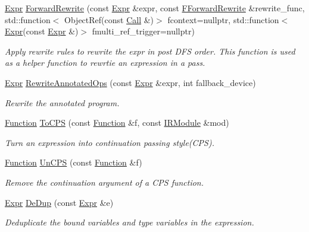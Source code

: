 \begin{DoxyCompactItemize}
\hyperlink{namespacetvm_1_1relay_a5b84e3790f89bb3fad5c7911eeb99531}{Expr} \hyperlink{namespacetvm_1_1relay_ae6b8ec762f81290872d611c40cc72458}{Forward\+Rewrite} (const \hyperlink{namespacetvm_1_1relay_a5b84e3790f89bb3fad5c7911eeb99531}{Expr} \&expr, const \hyperlink{namespacetvm_1_1relay_aa04117f6f0a173924ff2f6d080c9265c}{F\+Forward\+Rewrite} \&rewrite\+\_\+func, std\+::function$<$ Object\+Ref(const \hyperlink{classtvm_1_1relay_1_1Call}{Call} \&)$>$ fcontext=nullptr, std\+::function$<$ \hyperlink{namespacetvm_1_1relay_a5b84e3790f89bb3fad5c7911eeb99531}{Expr}(const \hyperlink{namespacetvm_1_1relay_a5b84e3790f89bb3fad5c7911eeb99531}{Expr} \&)$>$ fmulti\+\_\+ref\+\_\+trigger=nullptr)
\begin{DoxyCompactList}\small\item\em Apply rewrite rules to rewrite the expr in post D\+FS order. This function is used as a helper function to rewrtie an expression in a pass. \end{DoxyCompactList}\item 
\hyperlink{namespacetvm_1_1relay_a5b84e3790f89bb3fad5c7911eeb99531}{Expr} \hyperlink{namespacetvm_1_1relay_a7917e50fbb560a15995e8a617d65d1ab}{Rewrite\+Annotated\+Ops} (const \hyperlink{namespacetvm_1_1relay_a5b84e3790f89bb3fad5c7911eeb99531}{Expr} \&expr, int fallback\+\_\+device)
\begin{DoxyCompactList}\small\item\em Rewrite the annotated program. \end{DoxyCompactList}\item 
\hyperlink{classtvm_1_1relay_1_1Function}{Function} \hyperlink{namespacetvm_1_1relay_ab9548d99857f7698f4fe64d056dcd46a}{To\+C\+PS} (const \hyperlink{classtvm_1_1relay_1_1Function}{Function} \&f, const \hyperlink{classtvm_1_1IRModule}{I\+R\+Module} \&mod)
\begin{DoxyCompactList}\small\item\em Turn an expression into continuation passing style(\+C\+P\+S). \end{DoxyCompactList}\item 
\hyperlink{classtvm_1_1relay_1_1Function}{Function} \hyperlink{namespacetvm_1_1relay_a1677d450d58078811f52fd70d67db515}{Un\+C\+PS} (const \hyperlink{classtvm_1_1relay_1_1Function}{Function} \&f)
\begin{DoxyCompactList}\small\item\em Remove the continuation argument of a C\+PS function. \end{DoxyCompactList}\item 
\hyperlink{namespacetvm_1_1relay_a5b84e3790f89bb3fad5c7911eeb99531}{Expr} \hyperlink{namespacetvm_1_1relay_a1ecbcbe35c7abd82b9eabf94f6b797d2}{De\+Dup} (const \hyperlink{namespacetvm_1_1relay_a5b84e3790f89bb3fad5c7911eeb99531}{Expr} \&e)
\begin{DoxyCompactList}\small\item\em Deduplicate the bound variables and type variables in the expression. \end{DoxyCompactList}\end{DoxyCompactItemize}
